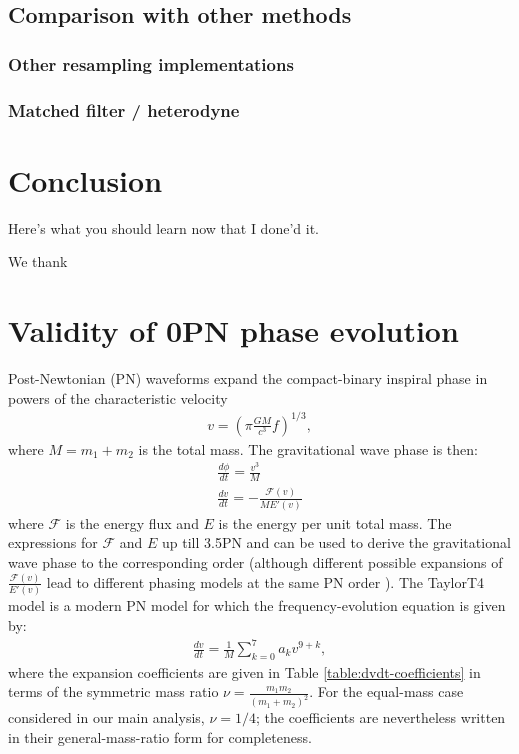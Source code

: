 \documentclass[aps,prd,amsmath,floats,floatfix, twocolumn,
superscriptaddress,nofootinbib,showpacs]{revtex4-2}
\begin{document}
\subsection{Comparison with other methods}

\subsubsection{Other resampling implementations}

\subsubsection{Matched filter / heterodyne}




\section{Conclusion}
\label{sec:conclusion}
Here's what you should learn now that I done'd it.


\begin{acknowledgments}
We thank
\end{acknowledgments}  


\appendix

\section{Validity of 0PN phase evolution}
\label{sec:0PN_validity}
Post-Newtonian (PN) waveforms expand the compact-binary inspiral phase in powers of the characteristic velocity
\begin{gather}
    v = \left(\pi \frac{G M}{c^3} f\right)^{1/3},
\end{gather}
where $M=m_1+m_2$ is the total mass. The gravitational wave phase is then:
\begin{gather}
    \frac{d\phi}{dt} = \frac{v^3}{M} \\
    \frac{dv}{dt} = -\frac{\mathcal{F}(v)}{ME'(v)} 
\end{gather}
where $\mathcal{F}$ is the energy flux and $E$ is the energy per unit total mass. The expressions for $\mathcal{F}$ and $E$ up till 3.5PN \cite{Faye:2012we} and can be used to derive the gravitational wave phase to the corresponding order (although different possible expansions of $\frac{\mathcal{F}(v)}{E'(v)}$ lead to different phasing models at the same PN order \cite{Buonanno:2009zt}). The TaylorT4 model \cite{Buonanno:2002fy} is a modern PN model for which the frequency-evolution equation is given by:
\begin{gather}
    \frac{dv}{dt} = \frac{1}{M}\sum_{k=0}^{7} a_k v^{9+k} ,
\end{gather}
where the expansion coefficients are given in Table \ref{table:dvdt-coefficients} in terms of the symmetric mass ratio $\nu = \frac{m_1 m_2}{(m_1 + m_2)^2}$. For the equal-mass case considered in our main analysis, $\nu=1/4$; the coefficients are nevertheless written in their general-mass-ratio form for completeness.
\end{document}
